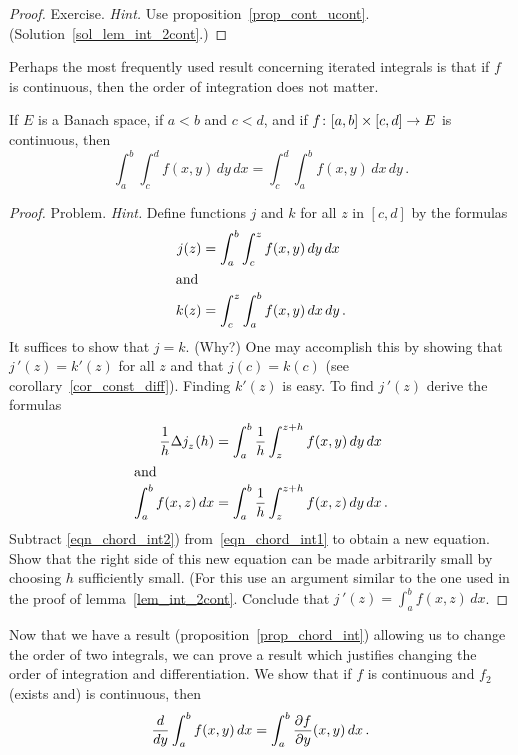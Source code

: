 \begin{proof} Exercise.   \emph{Hint.}  Use proposition~\ref{prop_cont_ucont}.
(Solution~\ref{sol_lem_int_2cont}.) \ns
\end{proof}

Perhaps the most frequently used result concerning iterated integrals is that if $f$ is
continuous, then the order of integration does not matter.

\begin{prop}\label{prop_chord_int}  If $E$ is a Banach space, if $a < b$ and $c < d$, and if \linebreak
$f\colon [a,b]\times [c,d] \rightarrow E$ is continuous, then
  \[ \int_a^b \int_c^d f(x,y)\,dy\,dx = \int_c^d \int_a^b f(x,y)\,dx\,dy\,. \]
\end{prop}

\begin{proof} Problem.  \emph{Hint.}    Define functions $j$ and $k$ for all $z$ in $[c,d]$ by
the formulas
  \begin{align*}
               j(z) &= \int_a^b \int_c^z f(x,y)\,dy\,dx \\
   \intertext{and}
               k(z) &= \int_c^z \int_a^b f(x,y)\,dx\,dy\,.
  \end{align*}
It suffices to show that $j = k$.  (Why?)  One may accomplish this by showing that $j\,'(z) =
k'(z)$ for all $z$ and that $j(c) = k(c)$ (see corollary~\ref{cor_const_diff}).  Finding
$k'(z)$ is easy.  To find $j\,'(z)$ derive the formulas
  \begin{align}
       \frac 1h \Delta j_{{}_{{\scriptstyle{z}}}}(h)
              &= \int_a^b \frac 1h \int_z^{z+h}f(x,y)\,dy\,dx \label{eqn_chord_int1} \\
   \intertext{and}
       \int_a^b f(x,z)\,dx
             &= \int_a^b \frac 1h \int_z^{z+h}f(x,z)\,dy\,dx\,. \label{eqn_chord_int2}
  \end{align}
Subtract \eqref{eqn_chord_int2}) from~\eqref{eqn_chord_int1} to obtain a new equation.  Show
that the right side of this new equation can be made arbitrarily small by choosing $h$
sufficiently small.  (For this use an argument similar to the one used in the proof of
lemma~\ref{lem_int_2cont}.  Conclude that $j\,'(z) = \int_a^b f(x,z)\,dx$.    \ns
\end{proof}


Now that we have a result (proposition~\ref{prop_chord_int}) allowing us to change the order
of two integrals, we can prove a result which justifies changing the order of integration and
differentiation. We show that if $f$ is continuous and $f_2$ (exists and) is continuous, then
  \[ \dfrac d{dy} \int_a^b f(x,y)\,dx = \int_a^b \frac{\partial f}{\partial y} (x,y)\,dx\,. \]

